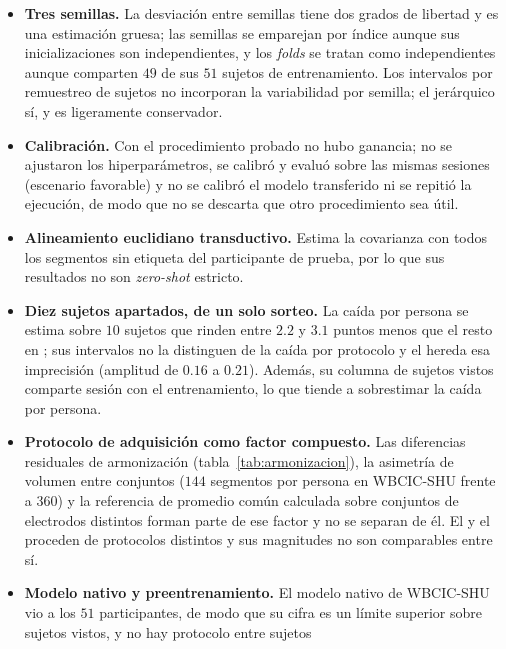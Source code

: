 \begin{itemize}
        signo del efecto coincide con el del cambio en esa proporción; las diferencias intra-sujeto no se
        atribuyen por tanto a la capacidad ni a la representación.
  \item \textbf{Tres semillas.} La desviación entre semillas tiene dos grados de libertad y es una estimación
        gruesa; las semillas se emparejan por índice aunque sus inicializaciones son independientes, y los
        \textit{folds} \loso{} se tratan como independientes aunque comparten $49$ de sus $51$ sujetos de
        entrenamiento. Los intervalos por remuestreo de sujetos no incorporan la variabilidad por semilla; el
        jerárquico sí, y es ligeramente conservador.
  \item \textbf{Calibración.} Con el procedimiento probado no hubo ganancia; no se ajustaron los
        hiperparámetros, se calibró y evaluó sobre las mismas sesiones (escenario favorable) y no se calibró el
        modelo transferido ni se repitió la ejecución, de modo que no se descarta que otro procedimiento sea
        útil.
  \item \textbf{Alineamiento euclidiano transductivo.} Estima la covarianza con todos los segmentos sin
        etiqueta del participante de prueba, por lo que sus resultados no son \textit{zero-shot} estricto.
  \item \textbf{Diez sujetos apartados, de un solo sorteo.} La caída por persona se estima sobre $10$
        sujetos que rinden entre $2.2$ y $3.1$ puntos menos que el resto en \loso{}; sus intervalos no la
        distinguen de la caída por protocolo y el \idp{} hereda esa imprecisión (amplitud de $0.16$ a $0.21$).
        Además, su columna de sujetos vistos comparte sesión con el entrenamiento, lo que tiende a
        sobrestimar la caída por persona.
  \item \textbf{Protocolo de adquisición como factor compuesto.} Las diferencias residuales de
        armonización (tabla~\ref{tab:armonizacion}), la asimetría de volumen entre conjuntos ($144$ segmentos
        por persona en WBCIC-SHU frente a $360$) y la referencia de promedio común calculada sobre conjuntos de
        electrodos distintos forman parte de ese factor y no se separan de él. El \dsi{} y el \idp{} proceden
        de protocolos distintos y sus magnitudes no son comparables entre sí.
  \item \textbf{Modelo nativo y preentrenamiento.} El modelo nativo de WBCIC-SHU vio a los $51$ participantes,
        de modo que su cifra es un límite superior sobre sujetos vistos, y no hay protocolo entre sujetos

\end{itemize}
